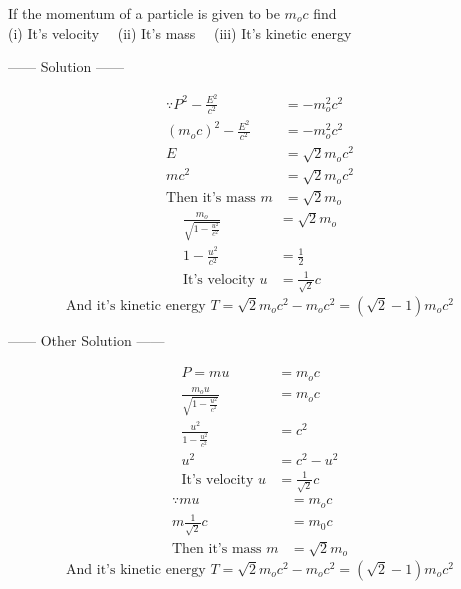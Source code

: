 \begin{example}
If the momentum of a particle is given to be $m_o c$ find 
\\(i) It's velocity \ \ (ii) It's mass \ \ (iii) It's kinetic energy
\begin{center}
    ------ \textcolor{Solution}{Solution} ------
\end{center}
\begin{align*}
    \because P^2 - \frac{E^2}{c^2} &= -m_o^2 c^2\\
    {(m_o c)}^2 - \frac{E^2}{c^2} &= -m_o^2 c^2\\
    E &= \sqrt{2} m_o c^2\\
    m c^2 &= \sqrt{2} m_o c^2\\
    \text{Then it's mass } m &= \sqrt{2} m_o
\end{align*}
\begin{align*}
    \frac{m_o}{\sqrt{1 - \frac{u^2}{c^2}}} &= \sqrt{2} m_o\\
    1 - \frac{u^2}{c^2} &= \frac{1}{2}\\
    \text{It's velocity } u &= \frac{1}{\sqrt{2}} c
\end{align*}
\[
    \text{And it's kinetic energy } T = \sqrt{2} m_o c^2 - m_o c^2 = \left(\sqrt{2} -1\right)m_o c^2
\]
\begin{center}
    ------ \textcolor{Solution}{Other Solution} ------
\end{center}
\begin{align*}
    P = mu &= m_o c\\
    \frac{m_o u}{\sqrt{1 - \frac{u^2}{c^2}}} &= m_o c\\
    \frac{u^2}{1 - \frac{u^2}{c^2}} &= c^2\\
    u^2 &= c^2 - u^2\\
    \text{It's velocity } u &= \frac{1}{\sqrt{2}} c
\end{align*}
\begin{align*}
    \because mu &= m_o c\\
        m \frac{1}{\sqrt{2}} c &= m_0 c\\
        \text{Then it's mass } m &= \sqrt{2} m_o
\end{align*}
\[
    \text{And it's kinetic energy } T = \sqrt{2} m_o c^2 - m_o c^2 = \left(\sqrt{2} -1\right)m_o c^2
\]
\end{example}
